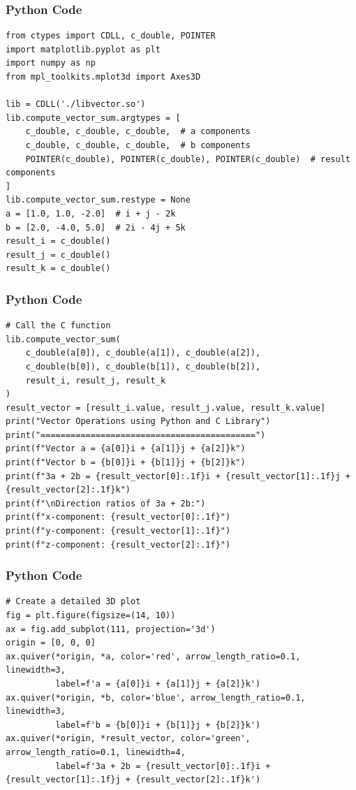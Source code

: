 \documentclass{beamer}
\begin{document}
\begin{frame}[fragile]
\frametitle{Python Code}
   \begin{lstlisting}
from ctypes import CDLL, c_double, POINTER
import matplotlib.pyplot as plt
import numpy as np
from mpl_toolkits.mplot3d import Axes3D

lib = CDLL('./libvector.so')
lib.compute_vector_sum.argtypes = [
    c_double, c_double, c_double,  # a components
    c_double, c_double, c_double,  # b components
    POINTER(c_double), POINTER(c_double), POINTER(c_double)  # result components
]
lib.compute_vector_sum.restype = None
a = [1.0, 1.0, -2.0]  # i + j - 2k
b = [2.0, -4.0, 5.0]  # 2i - 4j + 5k
result_i = c_double()
result_j = c_double()
result_k = c_double()
   \end{lstlisting}
\end{frame}
\begin{frame}[fragile]
\frametitle{Python Code}
   \begin{lstlisting}
# Call the C function
lib.compute_vector_sum(
    c_double(a[0]), c_double(a[1]), c_double(a[2]),
    c_double(b[0]), c_double(b[1]), c_double(b[2]),
    result_i, result_j, result_k
)
result_vector = [result_i.value, result_j.value, result_k.value]
print("Vector Operations using Python and C Library")
print("===========================================")
print(f"Vector a = {a[0]}i + {a[1]}j + {a[2]}k")
print(f"Vector b = {b[0]}i + {b[1]}j + {b[2]}k")
print(f"3a + 2b = {result_vector[0]:.1f}i + {result_vector[1]:.1f}j + {result_vector[2]:.1f}k")
print(f"\nDirection ratios of 3a + 2b:")
print(f"x-component: {result_vector[0]:.1f}")
print(f"y-component: {result_vector[1]:.1f}")
print(f"z-component: {result_vector[2]:.1f}")
\end{lstlisting}
\end{frame}
\begin{frame}[fragile]
\frametitle{Python Code}
   \begin{lstlisting}
# Create a detailed 3D plot
fig = plt.figure(figsize=(14, 10))
ax = fig.add_subplot(111, projection='3d')
origin = [0, 0, 0]
ax.quiver(*origin, *a, color='red', arrow_length_ratio=0.1, linewidth=3, 
          label=f'a = {a[0]}i + {a[1]}j + {a[2]}k')
ax.quiver(*origin, *b, color='blue', arrow_length_ratio=0.1, linewidth=3,
          label=f'b = {b[0]}i + {b[1]}j + {b[2]}k')
ax.quiver(*origin, *result_vector, color='green', arrow_length_ratio=0.1, linewidth=4,
          label=f'3a + 2b = {result_vector[0]:.1f}i + {result_vector[1]:.1f}j + {result_vector[2]:.1f}k')
\end{lstlisting}
\end{frame}
\end{document}
